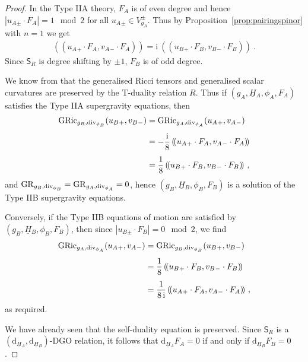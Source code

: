 \documentclass[a4paper, reqno, 11pt]{amsart}
\numberwithin{equation}{section}
\theoremstyle{definition}
\newcommand{\red}[1]{\underline{#1}}
\newcommand{\de}{\mathrm{d}}
\newcommand{\ii}{\mathrm{i}}
\newcommand{\gric}{\mathrm{GRic}}
\newcommand{\sfS}{{\mathsf{S}}}
\renewcommand{\div}{{\rm div}}
\theoremstyle{remark}
\begin{document}
\begin{proof}
    In the Type IIA theory, $F_A$ is of even degree and hence $|u_A{}_\pm \cdot F_A| = 1 \mod 2$ for all $u_A{}_\pm\in V_{g_A}^\pm$. Thus by Proposition~\ref{prop:pairingspinor} with $n=1$ we get
    \begin{align}
        (\!(u_A{}_+ \cdot F_A, v_A{}_- \cdot F_A)\!) = \ii \ (\!(u_B{}_+ \cdot F_B, v_B{}_- \cdot F_B)\!) \ .
    \end{align}
    Since $\sfS_R$ is degree shifting by $\pm 1$, $F_B$ is of odd degree.
    
    We know from \cite[Theorem 4.14]{deFraja2025Ricci} that the generalised Ricci tensors and generalised scalar curvatures are preserved by the T-duality relation $R$. 
    Thus if $(g_A,\red H{}_A,\phi_A, F_A)$ satisfies the Type IIA supergravity equations, then
    \begin{equation}
    \begin{aligned}
        \gric_{g_B,\div_{\phi_B}}(u_B{}_+,v_B{}_-) &= \gric_{g_A,\div_{\phi_A}}(u_A{}_+,v_A{}_-) \\[4pt]
        &= -\frac{\ii}{8}\,(\!(u_A{}_+ \cdot F_A, v_A{}_- \cdot F_A)\!) \\[4pt]
        &= \frac{1}{8}\, (\!(u_B{}_+ \cdot F_B, v_B{}_- \cdot F_B)\!) \ ,
    \end{aligned}
    \end{equation}
    and $\mathrm{GR}_{g_B,\div_{\phi_B}} = \mathrm{GR}_{g_A,\div_{\phi_A}}=0$, hence $(g_B, \red H{}_B, \phi_B, F_B)$ is a solution of the Type IIB supergravity equations.
    
    Conversely, if the Type IIB equations of motion are satisfied by $(g_B, \red H{}_B, \phi_B, F_B)$, then since $|u_B{}_\pm \cdot F_B| = 0 \mod 2$, we find
    \begin{equation}
    \begin{aligned}
        \gric_{g_A,\div_{\phi_A}}(u_A{}_+,v_A{}_-) &= \gric_{g_B,\div_{\phi_B}}(u_B{}_+,v_B{}_-) \\[4pt]
        &= \frac{1}{8}\,(\!(u_B{}_+ \cdot F_B, v_B{}_- \cdot F_B)\!) \\[4pt]
        &= \frac{1}{8\,\ii}\, (\!(u_A{}_+ \cdot F_A, v_A{}_- \cdot F_A)\!) \ ,
    \end{aligned}
    \end{equation}
    as required. 
    
    We have already seen that the self-duality equation is preserved. 
    Since $\sfS_R$ is a $(\de_{\red H{}_A}, \de_{\red H{}_B})$-DGO relation, it follows that $\de_{\red H{}_A} F_A = 0$ if and only if $\de_{\red H{}_B} F_B = 0$.
\end{proof}
\end{document}
